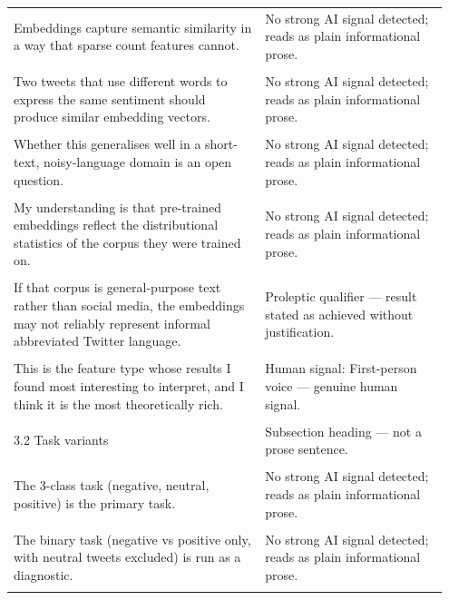 \documentclass[11pt]{article}
\begin{document}
\begin{longtable}{|p{0.55\linewidth}|p{0.40\linewidth}|}
\rule{0pt}{3.5cm} & \\
\hline
Embeddings capture semantic similarity in a way that sparse count features cannot. & No strong AI signal detected; reads as plain informational prose. \\[2pt]
\hline
\rule{0pt}{3.5cm} & \\
\hline
Two tweets that use different words to express the same sentiment should produce similar embedding vectors. & No strong AI signal detected; reads as plain informational prose. \\[2pt]
\hline
\rule{0pt}{3.5cm} & \\
\hline
Whether this generalises well in a short-text, noisy-language domain is an open question. & No strong AI signal detected; reads as plain informational prose. \\[2pt]
\hline
\rule{0pt}{3.5cm} & \\
\hline
My understanding is that pre-trained embeddings reflect the distributional statistics of the corpus they were trained on. & No strong AI signal detected; reads as plain informational prose. \\[2pt]
\hline
\rule{0pt}{3.5cm} & \\
\hline
If that corpus is general-purpose text rather than social media, the embeddings may not reliably represent informal abbreviated Twitter language. & Proleptic qualifier --- result stated as achieved without justification. \\[2pt]
\hline
\rule{0pt}{3.5cm} & \\
\hline
This is the feature type whose results I found most interesting to interpret, and I think it is the most theoretically rich. & Human signal: First-person voice --- genuine human signal. \\[2pt]
\hline
\rule{0pt}{3.5cm} & \\
\hline
3.2 Task variants & Subsection heading --- not a prose sentence. \\[2pt]
\hline
\rule{0pt}{3.5cm} & \\
\hline
The 3-class task (negative, neutral, positive) is the primary task. & No strong AI signal detected; reads as plain informational prose. \\[2pt]
\hline
\rule{0pt}{3.5cm} & \\
\hline
The binary task (negative vs positive only, with neutral tweets excluded) is run as a diagnostic. & No strong AI signal detected; reads as plain informational prose. \\[2pt]
\hline
\rule{0pt}{3.5cm} & \\

\end{longtable}
\end{document}
